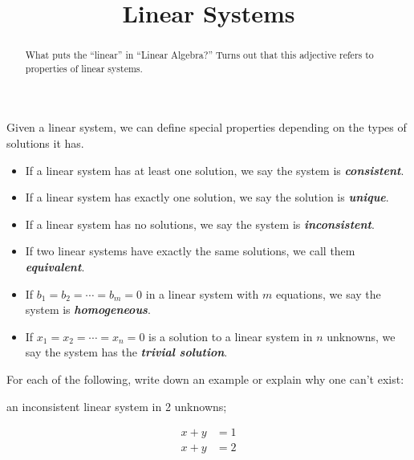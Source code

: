 \documentclass[hidelinks,12pt,handout]{ximera}
\title{Linear Systems}
\newcommand{\defi}[1]{\textbf{\textit{#1}}}
\begin{document}
\begin{abstract}{What puts the ``linear'' in ``Linear Algebra?'' Turns out that this adjective refers to properties of linear systems.}\end{abstract}
\maketitle

\begin{definition} Given a linear system, we can define special properties depending on the types of solutions it has.
\begin{itemize}
\item If a linear system has at least one solution, we say the system is \defi{consistent}.
\item If a linear system has exactly one solution, we say the solution is \defi{unique}.
\item If a linear system has no solutions, we say the system is \defi{inconsistent}.
\item If two linear systems have exactly the same solutions, we call them \defi{equivalent}.
\item If $b_1 = b_2 = \cdots = b_m = 0$ in a linear system with $m$ equations, we say the system is \defi{homogeneous}.
\item If $x_1 = x_2 = \cdots = x_n = 0$ is a solution to a linear system in $n$ unknowns, we say the system has the \defi{trivial solution}.
\end{itemize}
\end{definition}

For each of the following, write down an example or explain why one can't exist:
\begin{exercise}
\begin{question}
an inconsistent linear system in 2 unknowns;
\vfill
\begin{prompt}
	\begin{freeResponse}
			\begin{align*}x + y &= 1 \\ x + y &= 2 \end{align*}
	\end{freeResponse}
\end{prompt}
\end{question}
\end{exercise}
\end{document}
